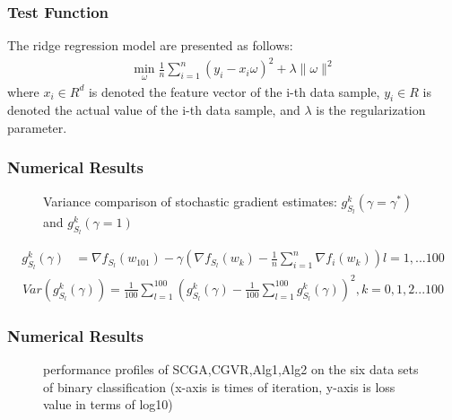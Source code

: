 \documentclass{beamer}
\begin{document}
\begin{frame}
	\frametitle{\bf Test Function} 
The ridge regression model are presented as follows:
\begin{equation}
	\begin{aligned}
		\min\limits_{\omega} \frac{1}{n} \sum_{i=1}^{n} (y_i -x_i \omega)^2 +\lambda \|\omega\|^2
		\label{5:ridge}
	\end{aligned}
\end{equation} 
where $x_i \in R^d$ is denoted the feature vector of the i-th  data sample, $y_i \in R$  is denoted the actual value of the i-th data sample, and $\lambda$  is the regularization parameter.
\end{frame}
\begin{frame}
	\frametitle{\bf Numerical Results} 
\begin{figure}
	\begin{center}
	\end{center}
	\caption{Variance comparison of stochastic gradient estimates: $g_{S_l}^k(\gamma=\gamma^*)$ and $g_{S_l}^k(\gamma=1)$}
	\label{fig:1}       %
\end{figure}
\begin{equation}
	\begin{aligned}
		g_{S_l}^k(\gamma) &= \nabla f_{S_l}(w_{101})-\gamma(\nabla f_{S_l}(w_{k})-\frac{1}{n}\sum_{i=1}^n \nabla f_i(w_k))
		l=1,...100
		\label{5:experiment_gradient}
	\end{aligned}
\end{equation}
\begin{equation}
	\begin{aligned}
		Var(g_{S_l}^k(\gamma))=\frac{1}{100}\sum_{l=1}^{100}(g_{S_l}^k(\gamma)-\frac{1}{100}\sum_{l=1}^{100}g_{S_l}^k(\gamma))^2, k=0,1,2...100
		\label{5:experiment_variance}
	\end{aligned}
\end{equation}
\end{frame}

\begin{frame}
	\frametitle{\bf Numerical Results} 

\begin{figure}
	\begin{center}
	\end{center}
	\caption{performance profiles of SCGA,CGVR,Alg1,Alg2 on the six data sets of binary classification (x-axis is times of iteration, y-axis is loss value in terms of log10)}
	\label{fig:2}       %
\end{figure}
\end{frame}
\end{document}
